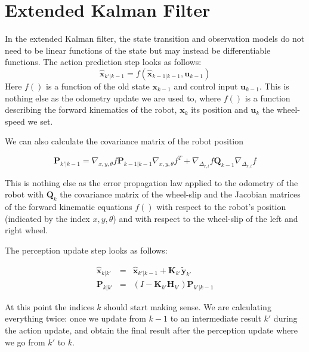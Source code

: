 \section{Extended Kalman Filter}\label{sec:EKF}
In the extended Kalman filter, the state transition and observation models do not need to be linear functions of the state but may instead be differentiable functions. The action prediction step looks as follows:
\begin{equation}
\hat{\boldsymbol{x}}_{k'|k-1} = f(\hat{\boldsymbol{x}}_{k-1|k-1}, \boldsymbol{u}_{k-1})
\end{equation}
Here $ f()$ is a function of the old state $ \boldsymbol{x}_{k-1}$ and control input $ \boldsymbol{u}_{k-1}$. This is nothing else as the odometry update we are used to, where $ f()$ is a function describing the forward kinematics of the robot, $ \boldsymbol{x}_k$ its position and $ \boldsymbol{u}_k$ the wheel-speed we set.

We can also calculate the covariance matrix of the robot position

\begin{equation}
\boldsymbol{P}_{k'|k-1} = \nabla_{x,y,\theta}f \boldsymbol{P}_{k-1|k-1}\nabla_{x,y,\theta}f^T + \nabla_{\Delta_{r,l}}f\boldsymbol{Q}_{k-1}\nabla_{\Delta_{r,l}}f
\end{equation}

This is nothing else as the error propagation law applied to the odometry of the robot with $ \boldsymbol{Q}_k$ the covariance matrix of the wheel-slip and the Jacobian matrices of the forward kinematic equations $ f()$ with respect to the robot's position (indicated by the index $ x,y,\theta$) and with respect to the wheel-slip of the left and right wheel.

The perception update step looks as follows:

\begin{eqnarray}
\hat{\boldsymbol{x}}_{k|k'} &=& \hat{\boldsymbol{x}}_{k'|k-1} + \boldsymbol{K}_{k'}\tilde{\boldsymbol{y}}_{k'}\\
\boldsymbol{P}_{k|k'} &=& (I - \boldsymbol{K}_{k'} {\boldsymbol{H}_{k'}}) \boldsymbol{P}_{k'|k-1}
\end{eqnarray}

At this point the indices $ k$ should start making sense. We are calculating everything twice: once we update from $ k-1$ to an intermediate result $ k'$ during the action update, and obtain the final result after the perception update where we go from $ k'$ to $ k$.

